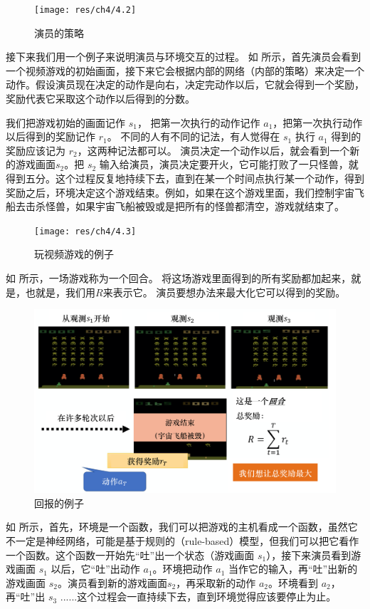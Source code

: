 \begin{figure}[hbt]
    \centering
    \texttt{[image: res/ch4/4.2]}
    \caption{演员的策略}
    \label{fig:fig4.2}
\end{figure}

接下来我们用一个例子来说明演员与环境交互的过程。
如 所示，首先演员会看到一个视频游戏的初始画面，接下来它会根据内部的网络（内部的策略）来决定一个动作。假设演员现在决定的动作是向右，决定完动作以后，它就会得到一个奖励，奖励代表它采取这个动作以后得到的分数。

我们把游戏初始的画面记作 $s_1$， 把第一次执行的动作记作 $a_1$，把第一次执行动作以后得到的奖励记作 $r_1$。
不同的人有不同的记法，有人觉得在 $s_1$ 执行 $a_1$ 得到的奖励应该记为 $r_2$，这两种记法都可以。
演员决定一个动作以后，就会看到一个新的游戏画面$s_2$。把 $s_2$ 输入给演员，演员决定要开火，它可能打败了一只怪兽，就得到五分。这个过程反复地持续下去，直到在某一个时间点执行某一个动作，得到奖励之后，环境决定这个游戏结束。例如，如果在这个游戏里面，我们控制宇宙飞船去击杀怪兽，如果宇宙飞船被毁或是把所有的怪兽都清空，游戏就结束了。

\begin{figure}[hbt]
    \centering
    \texttt{[image: res/ch4/4.3]}
    \caption{玩视频游戏的例子}
    \label{fig:fig4.3}
\end{figure}

如 所示，一场游戏称为一个回合。
将这场游戏里面得到的所有奖励都加起来，就是，也就是，我们用$R$来表示它。
演员要想办法来最大化它可以得到的奖励。

\begin{figure}[hbt]
    \centering
    \includegraphics[width=0.5\linewidth]{res/ch4/4.4}
    \caption{回报的例子}
    \label{fig:fig4.4}
\end{figure}

如 所示，首先，环境是一个函数，我们可以把游戏的主机看成一个函数，虽然它不一定是神经网络，可能是基于规则的（rule-based）模型，但我们可以把它看作一个函数。这个函数一开始先“吐”出一个状态（游戏画面 $s_1$），接下来演员看到游戏画面 $s_1$ 以后，它“吐”出动作 $a_1$。环境把动作 $a_1$ 当作它的输入，再“吐”出新的游戏画面 $s_2$。演员看到新的游戏画面$s_2$，再采取新的动作 $a_2$。环境看到 $a_2$，再“吐”出 $s_3$ ......这个过程会一直持续下去，直到环境觉得应该要停止为止。

